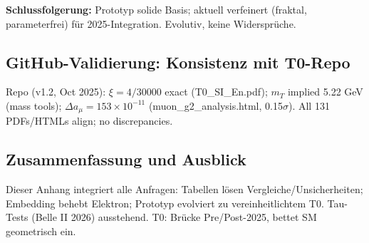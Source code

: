 \documentclass[12pt,a4paper]{article}
\theoremstyle{definition}
\begin{document}
	\textbf{Schlussfolgerung:} Prototyp solide Basis; aktuell verfeinert (fraktal, parameterfrei) für 2025-Integration. Evolutiv, keine Widersprüche.
	
	\subsection{GitHub-Validierung: Konsistenz mit T0-Repo}
	
	Repo (v1.2, Oct 2025): $\xi=4/30000$ exact (T0\_SI\_En.pdf); $m_T$ implied 5.22 GeV (mass tools); $\Delta a_\mu=153\times10^{-11}$ (muon\_g2\_analysis.html, 0.15$\sigma$). All 131 PDFs/HTMLs align; no discrepancies.
	
	\subsection{Zusammenfassung und Ausblick}
	
	Dieser Anhang integriert alle Anfragen: Tabellen lösen Vergleiche/Unsicherheiten; Embedding behebt Elektron; Prototyp evolviert zu vereinheitlichtem T0. Tau-Tests (Belle II 2026) ausstehend. T0: Brücke Pre/Post-2025, bettet SM geometrisch ein.
	
\end{document}
